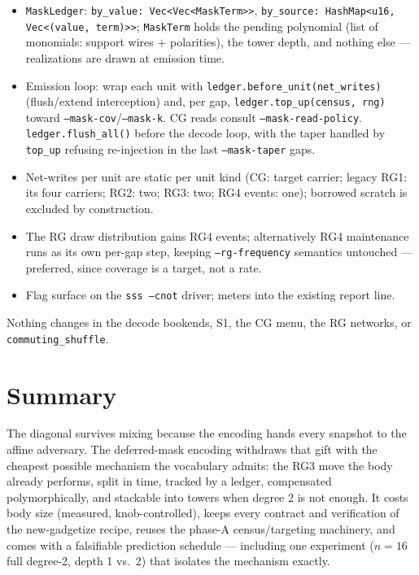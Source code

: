 \documentclass[11pt]{article}
\newcommand{\code}[1]{\texttt{#1}}
\begin{document}
\begin{itemize}
\item \code{MaskLedger}: \code{by\_value: Vec<Vec<MaskTerm>>},
\code{by\_source: HashMap<u16, Vec<(value, term)>>}; \code{MaskTerm}
holds the pending polynomial (list of monomials: support wires $+$
polarities), the tower depth, and nothing else --- realizations are drawn
at emission time.
\item Emission loop: wrap each unit with
\code{ledger.before\_unit(net\_writes)} (flush/extend interception) and,
per gap, \code{ledger.top\_up(census, rng)} toward
\code{--mask-cov}/\code{--mask-k}. CG reads consult
\code{--mask-read-policy}. \code{ledger.flush\_all()} before the decode
loop, with the taper handled by \code{top\_up} refusing re-injection in
the last \code{--mask-taper} gaps.
\item Net-writes per unit are static per unit kind (CG: target carrier;
legacy RG1: its four carriers; RG2: two; RG3: two; RG4 events: one);
borrowed scratch is excluded by construction.
\item The RG draw distribution gains RG4 events; alternatively RG4
maintenance runs as its own per-gap step, keeping \code{--rg-frequency}
semantics untouched --- preferred, since coverage is a target, not a
rate.
\item Flag surface on the \code{sss --cnot} driver; meters into the
existing report line.
\end{itemize}

Nothing changes in the decode bookends, S1, the CG menu, the RG networks,
or \code{commuting\_shuffle}.

\section*{Summary}

The diagonal survives mixing because the encoding hands every snapshot to
the affine adversary. The deferred-mask encoding withdraws that gift with
the cheapest possible mechanism the vocabulary admits: the RG3 move the
body already performs, split in time, tracked by a ledger, compensated
polymorphically, and stackable into towers when degree 2 is not enough.
It costs body size (measured, knob-controlled), keeps every contract and
verification of the new-gadgetize recipe, reuses the phase-A
census/targeting machinery, and comes with a falsifiable prediction
schedule --- including one experiment ($n{=}16$ full degree-2,
depth 1 vs.\ 2) that isolates the mechanism exactly.
\end{document}
